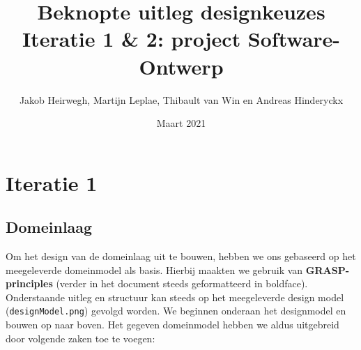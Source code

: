 \documentclass[12pt]{article}
\title{Beknopte uitleg designkeuzes\\ Iteratie 1 \& 2: project Software-Ontwerp}
\author{Jakob Heirwegh, Martijn Leplae, Thibault van Win en Andreas Hinderyckx}
\date{Maart 2021}
\begin{document}
\maketitle

\newpage
\section{Iteratie 1}\label{sec:Iteratie1}
\subsection{Domeinlaag}
Om het design van de domeinlaag uit te bouwen, hebben we ons gebaseerd op het meegeleverde domeinmodel als basis. Hierbij maakten we gebruik van \textbf{GRASP-principles} (verder in het document steeds geformatteerd in boldface). Onderstaande uitleg en structuur kan steeds op het meegeleverde design model (\texttt{designModel.png}) gevolgd worden. We beginnen onderaan het designmodel en bouwen op naar boven. Het gegeven domeinmodel hebben we aldus uitgebreid door volgende zaken toe te voegen:
\end{document}
